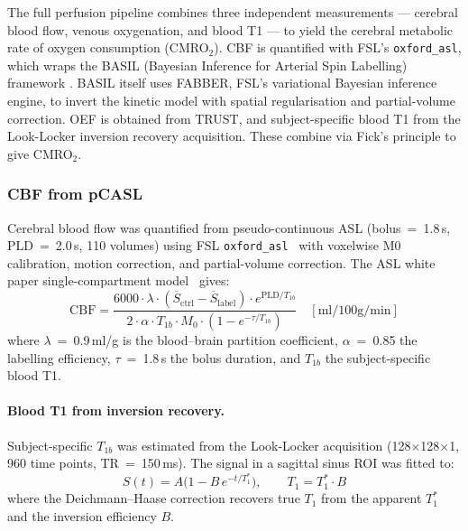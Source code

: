 \documentclass[11pt,a4paper]{article}\usepackage[]{graphicx}\usepackage[]{xcolor}
\begin{document}
The full perfusion pipeline combines three independent measurements
--- cerebral blood flow, venous oxygenation, and blood T1 --- to yield
the cerebral metabolic rate of oxygen consumption (CMRO$_2$). CBF is
quantified with FSL's \texttt{oxford\_asl}, which wraps the BASIL
(Bayesian Inference for Arterial Spin Labelling) framework
\citep{Alsop2015asl}. BASIL itself uses FABBER, FSL's variational
Bayesian inference engine, to invert the kinetic model with spatial
regularisation and partial-volume correction. OEF is obtained from
TRUST, and subject-specific blood T1 from the Look-Locker inversion
recovery acquisition. These combine via Fick's principle to give
CMRO$_2$.

\subsubsection{CBF from pCASL}

Cerebral blood flow was quantified from pseudo-continuous ASL
(bolus~=~1.8\,s, PLD~=~2.0\,s, 110 volumes) using FSL
\texttt{oxford\_asl}~\citep{Alsop2015asl} with voxelwise M0 calibration,
motion correction, and partial-volume correction. The ASL white paper
single-compartment model~\citep{Alsop2015asl} gives:
%
\begin{equation}
  \text{CBF} = \frac{6000 \cdot \lambda \cdot (\overline{S}_{\text{ctrl}} - \overline{S}_{\text{label}})
    \cdot e^{\text{PLD}/T_{1b}}}
    {2 \cdot \alpha \cdot T_{1b} \cdot M_0 \cdot (1 - e^{-\tau/T_{1b}})}
    \quad [\text{ml}/100\text{g}/\text{min}]
\end{equation}
%
where $\lambda$~=~0.9\,ml/g is the blood--brain partition coefficient,
$\alpha$~=~0.85 the labelling efficiency, $\tau$~=~1.8\,s the bolus
duration, and $T_{1b}$ the subject-specific blood T1.

\paragraph{Blood T1 from inversion recovery.}
Subject-specific $T_{1b}$ was estimated from the Look-Locker acquisition
(128$\times$128$\times$1, 960 time points, TR~=~150\,ms). The signal
in a sagittal sinus ROI was fitted to:
%
\begin{equation}
  S(t) = A\bigl(1 - B\,e^{-t/T_1^*}\bigr),
  \qquad T_1 = T_1^* \cdot B
\end{equation}
%
where the Deichmann--Haase correction recovers true $T_1$ from the
apparent $T_1^*$ and the inversion efficiency $B$.
\end{document}
